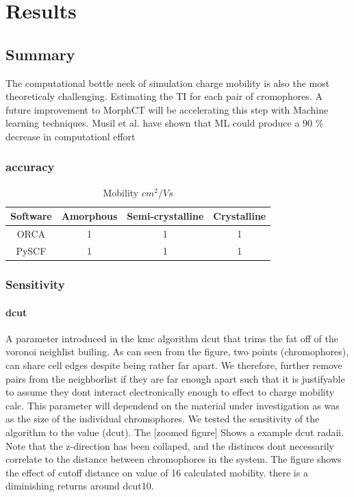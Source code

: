 \chapter{Results}
\label{chap:results}

\section{Summary}

\indent The computational bottle neck of simulation charge mobility is also the most theoreticaly challenging.
Estimating the TI for each pair of cromophores. A future improvement to MorphCT will be accelerating this step
with Machine learning techniques. Musil et al. have shown that ML could produce a 90 \% decrease in
computationl effort \cite{Musil2018}
\subsection{accuracy}
\begin{table}[ht]
    \caption{Mobility $cm^{2}/Vs$} %
\centering %
\begin{tabular}{c c c c} %
\hline\hline %
Software & Amorphous & Semi-crystalline & Crystalline \\ [0.5ex] %
\hline %
ORCA & 1 & 1 & 1 \\ %
PySCF & 1 & 1 & 1 \\ [1ex] %
\hline %
\end{tabular}
\label{table:nonlin} %
\end{table}
\subsection{Sensitivity}
\subsubsection{dcut}
A parameter introduced in the kmc algorithm dcut that trims the fat off of the voronoi neighlist builing.
As can seen from the figure, two points (chromophores), can share cell edges despite being rather far apart. We
therefore, further remove pairs from the neighborlist if they are far enough apart such that it is justifyable
to assume they dont interact electronically enough to effect to charge mobility calc. This parameter will
dependend on the material under investigation as was as the size of the individual chromophores. We tested the
sensitivity of the algorithm to the value (dcut). The [zoomed figure] Shows a example dcut radaii. Note that
the z-direction has been collaped, and the distinces dont necessarily correlate to the distance
between chromophores in the system. The figure shows the effect of cutoff distance on value of
16 calculated mobility. there is a diminishing returns around dcut10.


